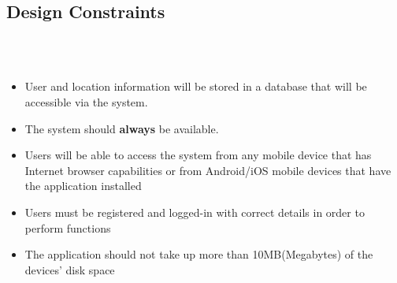 
\subsection{Design Constraints}
\\ \\
\begin{itemize}
    \item User and location information will be stored in a database that will be accessible via the system.
    \item The system should \textbf{always} be available.
    \item Users will be able to access the system from any mobile device that has Internet browser capabilities or from Android/iOS mobile devices that have the application installed
    \item Users must be registered and logged-in with correct details in order to perform functions
    \item The application should not take up more than 10MB(Megabytes) of the devices' disk space
    
\end{itemize}
